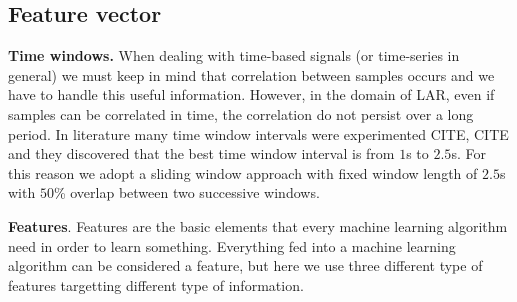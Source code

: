 \subsection{Feature vector}
\label{subsec:feature-vector}

\textbf{Time windows.} When dealing with time-based signals (or
time-series in general) we must keep in mind that correlation between
samples occurs and we have to handle this useful information. However,
in the domain of LAR, even if samples can be correlated in time, the
correlation do not persist over a long period. In literature many time
window intervals were experimented CITE, CITE and they discovered that
the best time window interval is from $1$s to $2.5$s. For this reason
we adopt a sliding window approach with fixed window length of $2.5$s
with $50$\% overlap between two successive windows.

\textbf{Features}. Features are the basic elements that every machine
learning algorithm need in order to learn something. Everything fed
into a machine learning algorithm can be considered a feature, but
here we use three different type of features targetting different type
of information.

